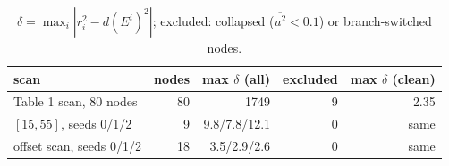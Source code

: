 \begin{table}[H]\centering\small
\begin{tabular}{lrrrr}
\toprule
scan & nodes & max $\delta$ (all) & excluded & max $\delta$ (clean)\\
\midrule
Table 1 scan, 80 nodes & 80 & 1749 & 9 & 2.35\\
$[15,55]$, seeds 0/1/2 & 9 & 9.8/7.8/12.1 & 0 & same\\
offset scan, seeds 0/1/2 & 18 & 3.5/2.9/2.6 & 0 & same\\
\bottomrule
\end{tabular}
\caption{$\delta=\max_i|r^2_i-d(E^i)^2|$; excluded: collapsed ($\overline{u^2}<0.1$) or branch-switched nodes.}
\end{table}
